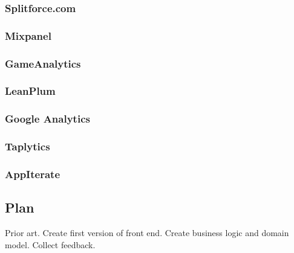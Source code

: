 \documentclass[english,12pt,a4paper,pdftex,elec,utf8]{aaltothesis}
\begin{document}
\subsubsection{Splitforce.com}
\subsubsection{Mixpanel}
\subsubsection{GameAnalytics}
\subsubsection{LeanPlum}
\subsubsection{Google Analytics}
\subsubsection{Taplytics}
\subsubsection{AppIterate}

\subsection{Plan}
Prior art. Create first version of front end. Create business logic and domain model. Collect feedback.




\end{document}

